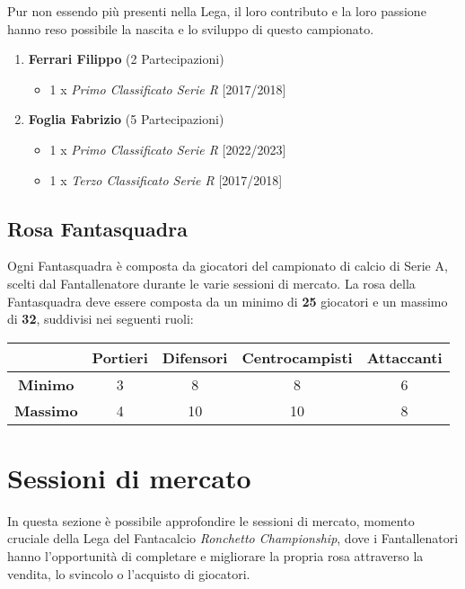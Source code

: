 \documentclass[12pt]{article}
\begin{document}
Pur non essendo più presenti nella Lega, il loro contributo e la loro passione hanno reso possibile la nascita e lo sviluppo di questo campionato. 

\begin{enumerate}
    \item \textbf{Ferrari Filippo} (2 Partecipazioni)
    \begin{itemize}
        \item 1 x \textit{Primo Classificato Serie R} [2017/2018]
    \end{itemize}
    \item \textbf{Foglia Fabrizio} (5 Partecipazioni)
    \begin{itemize}
        \item 1 x \textit{Primo Classificato Serie R} [2022/2023]
        \item 1 x \textit{Terzo Classificato Serie R} [2017/2018]
    \end{itemize}
\end{enumerate}
\subsection{Rosa Fantasquadra}\label{subsec:rosa-fantasquadra}
Ogni Fantasquadra è composta da giocatori del campionato di calcio di Serie A, scelti dal Fantallenatore durante le varie sessioni di mercato. La rosa della Fantasquadra deve essere composta da un minimo di \textbf{25} giocatori e un massimo di \textbf{32}, suddivisi nei seguenti ruoli: 
\newline
\\
\begin{tabular}{|c|c|c|c|c|}
    \hline
     & \textbf{Portieri} & \textbf{Difensori} & \textbf{Centrocampisti} & \textbf{Attaccanti} \\
    \hline
    \textbf{Minimo} & 3 & 8 & 8 & 6 \\
    \hline
    \textbf{Massimo} & 4 & 10 & 10 & 8 \\
    \hline
  \end{tabular}
\newline 


\newpage
\section{Sessioni di mercato}
In questa sezione è possibile approfondire le sessioni di mercato, momento cruciale della Lega del Fantacalcio \textit{Ronchetto Championship}, dove i Fantallenatori hanno l'opportunità di completare e migliorare la propria rosa attraverso la vendita, lo svincolo o l’acquisto di giocatori. 
\end{document}
